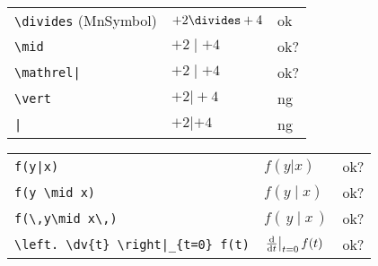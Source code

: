 \documentclass[a4paper]{article}
\newcommand{\tA}[1]{\textcolor{cA}{#1}}
\newcommand{\tC}[1]{\textcolor{cC}{#1}}
\newcommand{\tD}[1]{\textcolor{cD}{#1}}
\begin{document}
\begin{table}[H]
	\centering
	\begin{tabular}{lll}
		\verb#\divides# (MnSymbol) & $+2 \divides +4$  & \tA{ok}  \\
		\verb#\mid#                & $+2 \mid +4$      & \tC{ok?} \\
		\verb#\mathrel|#           & $+2 \mathrel| +4$ & \tC{ok?} \\
		\verb#\vert#               & $+2 \vert +4$     & \tD{ng}  \\
		\verb#|#                   & $+2 | +4$         & \tD{ng}  \\
	\end{tabular}
\end{table}

\begin{table}[H]
	\centering
	\begin{tabular}{lll}
		\verb#f(y|x)#                           & $f(y|x)$                           & \tC{ok?} \\
		\verb#f(y \mid x)#                      & $f(y \mid x)$                      & \tC{ok?} \\
		\verb#f(\,y\mid x\,)#                   & $f(\,y\mid x\,)$                   & \tC{ok?} \\
		\verb#\left. \dv{t} \right|_{t=0} f(t)# & $\left. \dv{t} \right|_{t=0} f(t)$ & \tC{ok?} \\
	\end{tabular}
\end{table}

\end{document}
